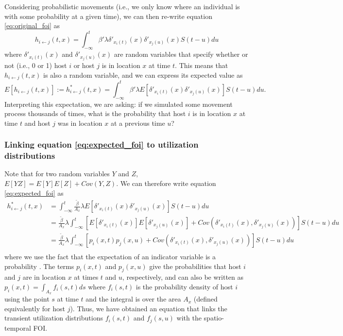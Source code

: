 \documentclass[letterpaper]{article}
\begin{document}
Considering probabilistic movements (i.e., we only know where an individual is with some probability at a given time), we can then re-write equation \ref{eq:original_foi} as
\begin{equation}
    h_{i \leftarrow j}(t, x) = \int_{-\infty}^{t} \beta' \lambda \delta'_{x_i(t)}(x) \delta'_{x_j(u)}(x) S(t - u) du
    \label{eq:prob_foi}
\end{equation}
where $\delta'_{x_i(t)}(x)$ and $\delta'_{x_j(u)}(x)$ are random variables that specify whether or not (i.e., 0 or 1) host $i$ or host $j$ is in location $x$ at time $t$.  This means that $h_{i \leftarrow j}(t, x)$ is also a random variable, and we can express its expected value as 
\begin{equation}
    E[h_{i \leftarrow j}(t, x)] := h^*_{i \leftarrow j}(t, x) = \int_{-\infty}^{t} \beta' \lambda E[\delta'_{x_i(t)}(x) \delta'_{x_j(u)}(x)] S(t - u) du.
    \label{eq:expected_foi}
\end{equation}
Interpreting this expectation, we are asking: if we simulated some movement process thousands of times, what is the probability that host $i$ is in location $x$ at time $t$ and host $j$ was in location $x$ at a previous time $u$? 

\subsubsection*{Linking equation \ref{eq:expected_foi} to utilization distributions}

Note that for two random variables $Y$ and $Z$, $E[YZ] = E[Y]E[Z] + Cov(Y, Z)$.  We can therefore write equation \ref{eq:expected_foi} as
\begin{equation}
    \begin{aligned}
        h^*_{i \leftarrow j}(t, x) &= \int_{-\infty}^{t} \frac{\tilde{\beta}}{A_x} \lambda E[\delta'_{x_i(t)}(x) \delta'_{x_j(u)}(x)] S(t - u) du \\
        &= \frac{\tilde{\beta}}{A_x} \lambda \int_{-\infty}^{t} [E[\delta'_{x_i(t)}(x)] E[\delta'_{x_j(u)}(x)] + Cov(\delta'_{x_i(t)}(x), \delta'_{x_j(u)}(x))] S(t - u) du \\
        &= \frac{\tilde{\beta}}{A_x} \lambda \int_{-\infty}^{t} [p_i(x, t) p_j(x, u) + Cov(\delta'_{x_i(t)}(x), \delta'_{x_j(u)}(x))] S(t - u) du \\
    \end{aligned}
    \label{eq:foi_cov}
\end{equation}
where we use the fact that the expectation of an indicator variable is a probability \citep{Grimmett2001}. The terms $p_i(x, t)$ and $p_j(x,u)$ give the probabilities that host $i$ and $j$ are in location $x$ at times $t$ and $u$, respectively, and can also be written as $p_i(x, t) = \int_{A_x} f_i(s, t) ds$ where $f_i(s, t)$ is the probability density of host $i$ using the point $s$ at time $t$ and the integral is over the area $A_x$ (defined equivalently for host $j$). Thus, we have obtained an equation that links the transient utilization distributions $f_i(s, t)$ and $f_j(s, u)$ with the spatio-temporal FOI.
\end{document}
